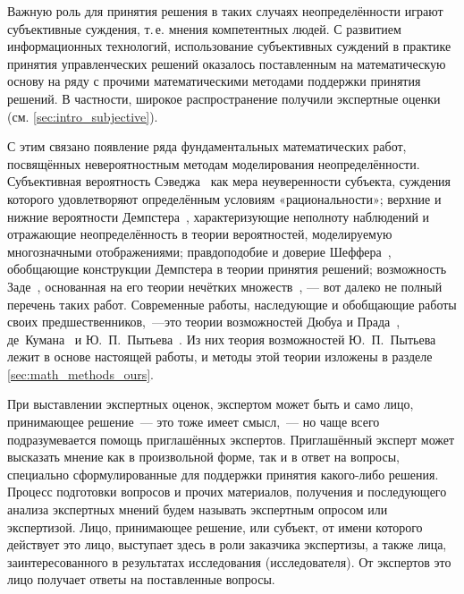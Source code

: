 Важную роль для принятия решения в таких случаях неопределённости играют субъективные суждения, т.\,е. мнения компетентных людей. С развитием информационных технологий, использование субъективных суждений в практике принятия управленческих решений оказалось поставленным на математическую основу на ряду с прочими математическими методами поддержки принятия решений. В частности, широкое распространение получили экспертные оценки (см. \ref{sec:intro_subjective}).

 С этим связано появление ряда фундаментальных математических работ, посвящённых невероятностным методам моделирования неопределённости. Субъективная вероятность Сэведжа~\cite{savage1972foundations} как мера неуверенности субъекта, суждения которого удовлетворяют определённым условиям «рациональности»; верхние и нижние вероятности Демпстера~\cite{dempster}, характеризующие неполноту наблюдений и отражающие неопределённость в теории вероятностей, моделируемую многозначными отображениями; правдоподобие и доверие Шеффера~\cite{shafer}, обобщающие конструкции Демпстера в теории принятия решений; возможность Заде~\cite{citeZadeh}, основанная на его теории нечётких множеств~\cite{ZadehPrime}, — вот далеко не полный перечень таких работ. Современные работы, наследующие и обобщающие работы своих предшественников,~---это теории возможностей Дюбуа и Прада~\cite{dubois_prade-1990, Dubois2015}, де~Кумана~\cite{de1992possibility} и Ю.~П.~Пытьева~\cite{possbook, probbook}. Из них теория возможностей Ю.~П.~Пытьева лежит в основе настоящей работы, и методы этой теории изложены в разделе \ref{sec:math_methods_ours}.  

При выставлении экспертных оценок, экспертом может быть и само лицо, принимающее решение~--- это тоже имеет смысл,~--- но чаще всего подразумевается помощь приглашённых экспертов.  Приглашённый эксперт может высказать мнение как в произвольной форме, так и в ответ на вопросы, специально сформулированные для поддержки принятия какого-либо решения. Процесс подготовки вопросов и прочих материалов, получения и последующего анализа экспертных мнений будем называть экспертным опросом или  экспертизой. Лицо, принимающее решение, или субъект, от имени которого действует это лицо, выступает здесь в роли заказчика экспертизы, а также лица, заинтересованного в результатах исследования (исследователя). От экспертов это лицо получает ответы на поставленные вопросы.

